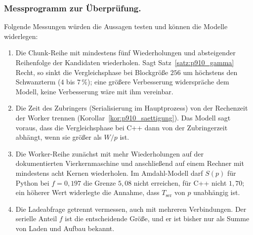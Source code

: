 \documentclass[a4paper,12pt, twoside]{report}
\theoremstyle{definition}
\begin{document}
\subsubsection{Messprogramm zur Überprüfung.} Folgende Messungen würden die Aussagen testen und können die Modelle widerlegen:
\begin{enumerate}[label=(M\arabic*)]
\item Die Chunk-Reihe mit mindestens fünf Wiederholungen und absteigender Reihenfolge der Kandidaten wiederholen. Sagt Satz~\ref{satz:p910_gamma} Recht, so sinkt die Vergleichsphase bei Blockgröße $256$ um höchstens den Schwanzterm ($4$ bis $7\,\%$); eine größere Verbesserung widerspräche dem Modell, keine Verbesserung wäre mit ihm vereinbar.
\item Die Zeit des Zubringers (Serialisierung im Hauptprozess) von der Rechenzeit der Worker trennen (Korollar~\ref{kor:p910_saettigung}). Das Modell sagt voraus, dass die Vergleichsphase bei C++ dann von der Zubringerzeit abhängt, wenn sie größer als $W/p$ ist.
\item Die Worker-Reihe zunächst mit mehr Wiederholungen auf der dokumentierten Vierkernmaschine und anschließend auf einem Rechner mit mindestens acht Kernen wiederholen. Im Amdahl-Modell darf $S(p)$ für Python bei $f=0{,}197$ die Grenze $5{,}08$ nicht erreichen, für C++ nicht $1{,}70$; ein höherer Wert widerlegte die Annahme, dass $T_{\mathrm{ser}}$ von $p$ unabhängig ist.
\item Die Ladeabfrage getrennt vermessen, auch mit mehreren Verbindungen. Der serielle Anteil $f$ ist die entscheidende Größe, und er ist bisher nur als Summe von Laden und Aufbau bekannt.
\end{enumerate}
\end{document}
